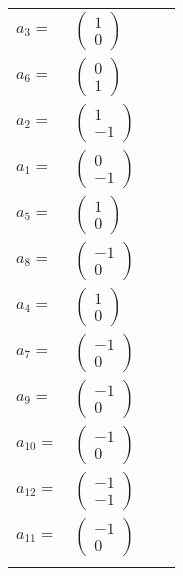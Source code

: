 \documentclass[1p]{elsarticle_modified}
\theoremstyle{definition}
\begin{document}
\begin{tabular}{m{7pt} m{180pt} m{7pt} m{180pt} }
\flushright $a_{3}=$&$\begin{pmatrix}1\\0\end{pmatrix}$ \\
\flushright $a_{6}=$&$\begin{pmatrix}0\\1\end{pmatrix}$ \\
\flushright $a_{2}=$&$\begin{pmatrix}1\\-1\end{pmatrix}$ \\
\flushright $a_{1}=$&$\begin{pmatrix}0\\-1\end{pmatrix}$ \\
\flushright $a_{5}=$&$\begin{pmatrix}1\\0\end{pmatrix}$ \\
\flushright $a_{8}=$&$\begin{pmatrix}-1\\0\end{pmatrix}$ \\
\flushright $a_{4}=$&$\begin{pmatrix}1\\0\end{pmatrix}$ \\
\flushright $a_{7}=$&$\begin{pmatrix}-1\\0\end{pmatrix}$ \\
\flushright $a_{9}=$&$\begin{pmatrix}-1\\0\end{pmatrix}$ \\
\flushright $a_{10}=$&$\begin{pmatrix}-1\\0\end{pmatrix}$ \\
\flushright $a_{12}=$&$\begin{pmatrix}-1\\-1\end{pmatrix}$ \\
\flushright $a_{11}=$&$\begin{pmatrix}-1\\0\end{pmatrix}$\\&\end{tabular}
\end{document}
